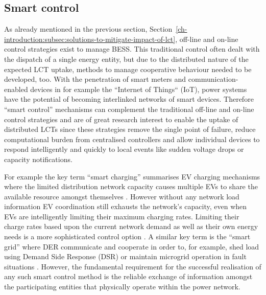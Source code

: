 \subsection{Smart control}
\label{ch-introduction:subsec:smart-control}


As already mentioned in the previous section, Section~\ref{ch-introduction:subsec:solutions-to-mitigate-impact-of-lct}, off-line and on-line control strategies exist to manage BESS.
This traditional control often dealt with the dispatch of a single energy entity, but due to the distributed nature of the expected LCT uptake, methods to manage cooperative behaviour needed to be developed, too.
With the penetration of smart meters and communication-enabled devices in for example the ``Internet of Things`` (IoT), power systems have the potential of becoming interlinked networks of smart devices.
Therefore ``smart control'' mechanisms can complement the traditional off-line and on-line control strategies and are of great research interest to enable the uptake of distributed LCTs since these strategies remove the single point of failure, reduce computational burden from centralised controllers and allow individual devices to respond intelligently and quickly to local events like sudden voltage drops or capacity notifications.

For example the key term ``smart charging'' summarises EV charging mechanisms where the limited distribution network capacity causes multiple EVs to share the available resource amongst themselves \cite{Sortomme2011, Vaya2012, Garcia-Villalobos2014}.
However without any network load information EV coordination still exhausts the network's capacity, even when EVs are intelligently limiting their maximum charging rates.
Limiting their charge rates based upon the current network demand as well as their own energy needs is a more sophisticated control option \cite{Karfopoulos2013}.
A similar key term is the ``smart grid'' where DER communicate and cooperate in order to, for example, shed load using Demand Side Response (DSR) or maintain microgrid operation in fault situations \cite{Samadi2012, Liu2014, Liang2014}.
However, the fundamental requirement for the successful realisation of any such smart control method is the reliable exchange of information amongst the participating entities that physically operate within the power network.

